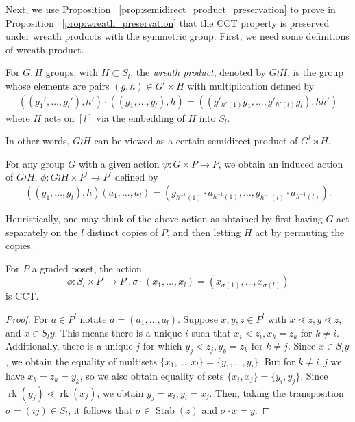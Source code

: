 \documentclass[smallextended]{svjour3}       %
\numberwithin{equation}{section}
\newcommand\rk{\operatorname{rk}}
\newcommand\Stab{\operatorname{Stab}}
\begin{document}
Next, we use Proposition ~\ref{prop:semidirect_product_preservation} to prove in Proposition ~\ref{prop:wreath_preservation} that the CCT property is preserved under wreath products with the symmetric group. First, we need some definitions of wreath product.

\begin{definition}
For $G, H$ groups, with $H \subset S_l$, the {\it wreath product}, denoted by $G \wr H$, is the group whose elements are pairs $(g,h) \in G^l\times H$ with multiplication defined by
\begin{align*}
((g_1',\ldots, g_l'),h') \cdot ((g_1,\ldots, g_l) ,h) =((g'_{h'(1)}g_1,\ldots, g'_{h'(l)}g_l),hh')
\end{align*}
where $H$ acts on $[l]$ via the embedding of $H$ into $S_l$.
\end{definition}

In other words, $G\wr H$ can be viewed as a certain semidirect product of $G^l \rtimes H$.

\begin{definition}
\label{defn:wreath_action}
For any group $G$ with a given action $\psi\colon G\times P \rightarrow P$, we obtain an induced action of $G \wr H$, $\phi\colon G \wr H \times P^l \rightarrow P^l$ defined by 
$$((g_1,\ldots, g_l),h)(a_1,\ldots, a_l) = (g_{h^{-1}(1)}\cdot a_{h^{-1}(1)},\ldots,g_{h^{-1}(l)} \cdot a_{h^{-1}(l)}).$$
\end{definition}

\begin{remark}
Heuristically, one may think of the above action as obtained by first having $G$ act separately on the $l$ distinct copies of $P$, and then letting $H$ act by permuting the copies.
\end{remark}

\begin{lemma}
\label{lem:symmetric_group_product_action}
For $P$ a graded poset, the action 
$$\phi\colon S_l \times P^l \rightarrow P^l,\sigma \cdot(x_1,\ldots, x_l) = (x_{\sigma(1)},\ldots, x_{\sigma(l)})$$
is CCT.
\end{lemma}
\begin{proof}
For $a \in P^l$ notate $a = (a_1,\ldots, a_l)$. Suppose $x,y,z \in P^l$ with $x\lessdot z,y\lessdot z$, and $x \in S_ly$. This means there is a unique $i$ such that $x_i \lessdot z_i,x_k = z_k$ for $k \neq i$. Additionally, there is a unique $j$ for which $y_j \lessdot z_j,y_k =z_k$ for $k \neq j$. Since $x \in S_ly$, we obtain the equality of multisets $\{x_1,\ldots, x_l\}=\{y_1,\ldots,y_l\}$. But for $k \neq i,j$ we have $x_k = z_k = y_k$, so we also obtain equality of sets $\{x_i,x_j\} = \{y_i,y_j\}$. Since $\rk(y_j) \lessdot \rk(x_j)$, we obtain $y_j = x_i,y_i = x_j$. Then, taking the transposition $\sigma  = (ij) \in S_l$, it follows that $\sigma \in \Stab(z)$ and $\sigma \cdot x = y$.
\end{proof}
\end{document}
